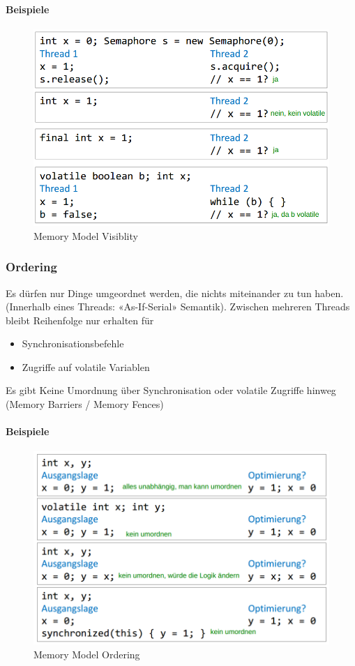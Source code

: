 \paragraph{Beispiele} \hfill
\begin{figure}[h!]
	\centering
	\includegraphics[width=0.6\linewidth]{img/memory_model_visibility}
	\caption{Memory Model Visiblity}
	\label{fig:memorymodelvisibility}
\end{figure}

\newpage

\subsubsection{Ordering}
Es dürfen nur Dinge umgeordnet werden, die nichts miteinander zu tun haben. (Innerhalb eines Threads: «As-If-Serial» Semantik). Zwischen mehreren Threads bleibt Reihenfolge nur erhalten für
\begin{itemize}
	\item Synchronisationsbefehle
	\item Zugriffe auf volatile Variablen
\end{itemize}
Es gibt Keine Umordnung über Synchronisation oder 
volatile Zugriffe hinweg
(Memory Barriers / Memory Fences)

\paragraph{Beispiele} \hfill
\begin{figure}[h!]
	\centering
	\includegraphics[width=0.6\linewidth]{img/memory_model_ordering}
	\caption{Memory Model Ordering}
	\label{fig:memorymodelordering}
\end{figure}



